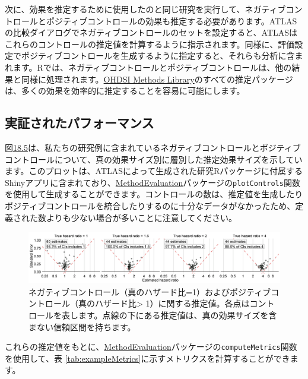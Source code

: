 \documentclass[
  11pt]{book}
\theoremstyle{definition}
\theoremstyle{definition}
\theoremstyle{definition}
\theoremstyle{definition}
\theoremstyle{remark}
\begin{document}
次に、効果を推定するために使用したのと同じ研究を実行して、ネガティブコントロールとポジティブコントロールの効果も推定する必要があります。ATLASの比較ダイアログでネガティブコントロールのセットを設定すると、ATLASはこれらのコントロールの推定値を計算するように指示されます。同様に、評価設定でポジティブコントロールを生成するように指定すると、それらも分析に含まれます。Rでは、ネガティブコントロールとポジティブコントロールは、他の結果と同様に処理されます。\href{https://ohdsi.github.io/MethodsLibrary/}{OHDSI Methods Library}のすべての推定パッケージは、多くの効果を効率的に推定することを容易に可能にします。

\subsection{実証されたパフォーマンス}\label{ux5b9fux8a3cux3055ux308cux305fux30d1ux30d5ux30a9ux30fcux30deux30f3ux30b9}

図\href{https://ohdsi.github.io/TheBookOfOhdsi/MethodValidity.html\#fig:controls}{18.5}は、私たちの研究例に含まれているネガティブコントロールとポジティブコントロールについて、真の効果サイズ別に層別した推定効果サイズを示しています。このプロットは、ATLASによって生成された研究Rパッケージに付属するShinyアプリに含まれており、\href{https://ohdsi.github.io/MethodEvaluation/}{MethodEvaluation}パッケージの\texttt{plotControls}関数を使用して生成することができます。コントロールの数は、推定値を生成したりポジティブコントロールを統合したりするのに十分なデータがなかったため、定義された数よりも少ない場合が多いことに注意してください。

\begin{figure}

{\centering \includegraphics[width=1\linewidth]{images/MethodValidity/controls} 

}

\caption{ネガティブコントロール（真のハザード比=1）およびポジティブコントロール（真のハザード比> 1）に関する推定値。各点はコントロールを表します。点線の下にある推定値は、真の効果サイズを含まない信頼区間を持ちます。}\label{fig:controls}
\end{figure}

これらの推定値をもとに、\href{https://ohdsi.github.io/MethodEvaluation/}{MethodEvaluation}パッケージの\texttt{computeMetrics}関数を使用して、表 \ref{tab:exampleMetrics}に示すメトリクスを計算することができます。
\end{document}
